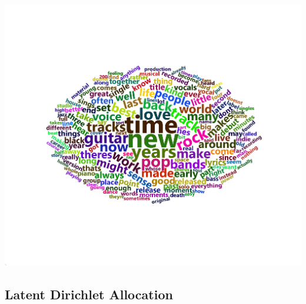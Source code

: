 \documentclass[a4paper,12pt]{article}
\begin{document}
\includegraphics[width = \linewidth]{"figures/wordcloud.png"}

\subsection{Latent Dirichlet Allocation}
\end{document}
